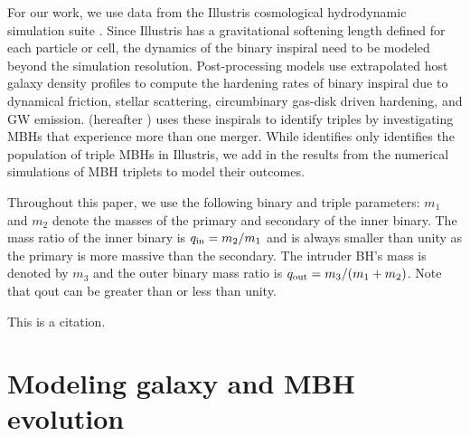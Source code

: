 \documentclass{book}
\begin{document}
For our work, we use data from the Illustris cosmological hydrodynamic simulation suite \citep{Vogelsberger_2013,Genel_2014,Nelson_2015}. Since Illustris has a gravitational softening length defined for each particle or cell, the dynamics of the binary inspiral need to be modeled beyond the simulation resolution. Post-processing models \citet{Kelley_2017a, Kelley_2017b,sayeb_massive_2021} use extrapolated host galaxy density profiles to compute the hardening rates of binary inspiral due to dynamical friction, stellar scattering, circumbinary gas-disk driven hardening, and GW emission. \citet{sayeb_mbh_2023} (hereafter \SB ) uses these inspirals to identify triples by investigating MBHs that experience more than one merger. While \SB{}  identifies only identifies the population of triple MBHs in Illustris, we add in the results from the \citet{bonetti_post-newtonian_2016,bonetti_post-newtonian_2018} numerical simulations of MBH triplets to model their outcomes.

Throughout this paper, we use the following binary and triple parameters: $m_1$ and $m_2$ denote the masses of the primary and secondary of the inner binary. The mass ratio of the inner binary is $q_{\rm in} = m_2/m_1$ and is always smaller than unity as the primary is more massive than the secondary. The intruder BH's mass is denoted by $m_3$ and the outer binary mass ratio is $q_{\rm out} = m_3/(m_1 + m_2)$. Note that qout can be greater than or less than unity.  





This is a citation\cite{Eg}.

\newpage



\chapter{Modeling galaxy and MBH evolution}
\end{document}
